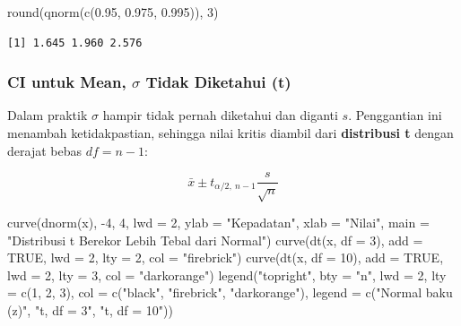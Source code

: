 \documentclass[
  indonesian,
  letterpaper,
]{book}
\newenvironment{Shaded}{\begin{snugshade}}{\end{snugshade}}
\newcommand{\AttributeTok}[1]{\textcolor[rgb]{0.40,0.45,0.13}{#1}}
\newcommand{\ConstantTok}[1]{\textcolor[rgb]{0.56,0.35,0.01}{#1}}
\newcommand{\DecValTok}[1]{\textcolor[rgb]{0.68,0.00,0.00}{#1}}
\newcommand{\FloatTok}[1]{\textcolor[rgb]{0.68,0.00,0.00}{#1}}
\newcommand{\FunctionTok}[1]{\textcolor[rgb]{0.28,0.35,0.67}{#1}}
\newcommand{\NormalTok}[1]{\textcolor[rgb]{0.00,0.23,0.31}{#1}}
\newcommand{\SpecialCharTok}[1]{\textcolor[rgb]{0.37,0.37,0.37}{#1}}
\newcommand{\StringTok}[1]{\textcolor[rgb]{0.13,0.47,0.30}{#1}}
\begin{document}
\begin{Shaded}
\begin{Highlighting}[]
\FunctionTok{round}\NormalTok{(}\FunctionTok{qnorm}\NormalTok{(}\FunctionTok{c}\NormalTok{(}\FloatTok{0.95}\NormalTok{, }\FloatTok{0.975}\NormalTok{, }\FloatTok{0.995}\NormalTok{)), }\DecValTok{3}\NormalTok{)}
\end{Highlighting}
\end{Shaded}

\begin{verbatim}
[1] 1.645 1.960 2.576
\end{verbatim}

\subsubsection{\texorpdfstring{CI untuk Mean, \(\sigma\) Tidak Diketahui
(t)}{CI untuk Mean, \textbackslash sigma Tidak Diketahui (t)}}\label{ci-untuk-mean-sigma-tidak-diketahui-t}

Dalam praktik \(\sigma\) hampir tidak pernah diketahui dan diganti
\(s\). Penggantian ini menambah ketidakpastian, sehingga nilai kritis
diambil dari \textbf{distribusi t} dengan derajat bebas \(df = n - 1\):

\[\bar{x} \pm t_{\alpha/2,\ n-1} \frac{s}{\sqrt{n}}\]

\begin{Shaded}
\begin{Highlighting}[]
\FunctionTok{curve}\NormalTok{(}\FunctionTok{dnorm}\NormalTok{(x), }\SpecialCharTok{{-}}\DecValTok{4}\NormalTok{, }\DecValTok{4}\NormalTok{, }\AttributeTok{lwd =} \DecValTok{2}\NormalTok{, }\AttributeTok{ylab =} \StringTok{"Kepadatan"}\NormalTok{, }\AttributeTok{xlab =} \StringTok{"Nilai"}\NormalTok{,}
      \AttributeTok{main =} \StringTok{"Distribusi t Berekor Lebih Tebal dari Normal"}\NormalTok{)}
\FunctionTok{curve}\NormalTok{(}\FunctionTok{dt}\NormalTok{(x, }\AttributeTok{df =} \DecValTok{3}\NormalTok{),  }\AttributeTok{add =} \ConstantTok{TRUE}\NormalTok{, }\AttributeTok{lwd =} \DecValTok{2}\NormalTok{, }\AttributeTok{lty =} \DecValTok{2}\NormalTok{, }\AttributeTok{col =} \StringTok{"firebrick"}\NormalTok{)}
\FunctionTok{curve}\NormalTok{(}\FunctionTok{dt}\NormalTok{(x, }\AttributeTok{df =} \DecValTok{10}\NormalTok{), }\AttributeTok{add =} \ConstantTok{TRUE}\NormalTok{, }\AttributeTok{lwd =} \DecValTok{2}\NormalTok{, }\AttributeTok{lty =} \DecValTok{3}\NormalTok{, }\AttributeTok{col =} \StringTok{"darkorange"}\NormalTok{)}
\FunctionTok{legend}\NormalTok{(}\StringTok{"topright"}\NormalTok{, }\AttributeTok{bty =} \StringTok{"n"}\NormalTok{, }\AttributeTok{lwd =} \DecValTok{2}\NormalTok{, }\AttributeTok{lty =} \FunctionTok{c}\NormalTok{(}\DecValTok{1}\NormalTok{, }\DecValTok{2}\NormalTok{, }\DecValTok{3}\NormalTok{), }\AttributeTok{col =} \FunctionTok{c}\NormalTok{(}\StringTok{"black"}\NormalTok{, }\StringTok{"firebrick"}\NormalTok{, }\StringTok{"darkorange"}\NormalTok{),}
       \AttributeTok{legend =} \FunctionTok{c}\NormalTok{(}\StringTok{"Normal baku (z)"}\NormalTok{, }\StringTok{"t, df = 3"}\NormalTok{, }\StringTok{"t, df = 10"}\NormalTok{))}
\end{Highlighting}
\end{Shaded}
\end{document}
